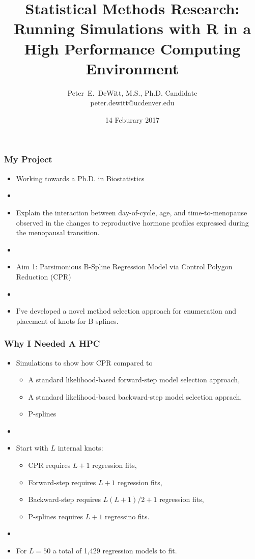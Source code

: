 \documentclass[10pt]{beamer}
\author[Peter~E.~DeWitt]{Peter~E.~DeWitt, M.S., Ph.D. Candidate\\{peter.dewitt@ucdenver.edu}\vspace{0.25in}}
\title[]{Statistical Methods Research:\\Running Simulations with R in a High Performance
Computing Environment}
\institute[CSPH, UCD, BIOS]{Colorado School of Public Health\\University of Colorado Denver\\Department of Biostatistics and Informatics}
\date{14 Feburary 2017}
\begin{document}
 
\watermarkoff

\begin{frame}[t,plain]
  \titlepage
\end{frame}

\begin{frame}[t]
  \frametitle{My Project}
  \begin{itemize}
    \item Working towards a Ph.D. in Biostatistics
    \item[]
    \item Explain the interaction between day-of-cycle, age, and time-to-menopause
      observed in the changes to reproductive hormone profiles expressed during
      the menopausal transition.
    \item[]
    \item Aim 1: Parsimonious B-Spline Regression Model via Control Polygon
      Reduction (CPR)
    \item[]
    \item I've developed a novel method selection approach for enumeration and
      placement of knots for B-splines.  
  \end{itemize}
\end{frame}

\begin{frame}[t]
  \frametitle{Why I Needed A HPC}
  \begin{itemize}
    \item Simulations to show how CPR compared to
      \begin{itemize}
        \item A standard likelihood-based forward-step model selection approach,
        \item A standard likelihood-based backward-step model selection apprach,
        \item P-splines
      \end{itemize}

    \item[]

    \item Start with $L$ internal knots:
      \begin{itemize}
        \item CPR requires $L + 1$ regression fits,
        \item Forward-step requires $L + 1$ regression fits,
        \item Backward-step requires $L(L+1)/2 + 1$ regression fits,
        \item P-splines requires $L + 1$ regressino fits.
      \end{itemize}

    \item[]

    \item For $L = 50$ a total of 1,429 regression models to fit.
      
  \end{itemize}
\end{frame}
\end{document}
